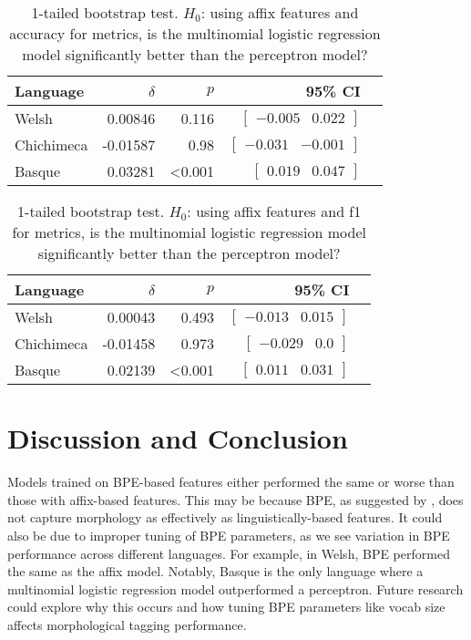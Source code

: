 \documentclass{article}
\begin{document}
\begin{table}[ht]
\centering
\begin{tabular}{lrrrc}
\textbf{Language} & $\delta$ & $p$ & \textbf{95\% CI}\\
\hline
Welsh & 0.00846 & 0.116 & $\begin{bmatrix}-0.005 & 0.022\end{bmatrix}$ \\
Chichimeca & -0.01587 & 0.98 & $\begin{bmatrix}-0.031 & -0.001\end{bmatrix}$ \\
Basque & 0.03281 & <0.001 & $\begin{bmatrix}0.019 & 0.047\end{bmatrix}$ \\
\end{tabular}
\caption{1-tailed bootstrap test. $H_0$: using affix features and accuracy for metrics, is the multinomial logistic regression model significantly better than the perceptron model?}
\label{tab:bpe-accuracy-mc}
\end{table}
\begin{table}[ht]
\centering
\begin{tabular}{lrrrc}
\textbf{Language} & $\delta$ & $p$ & \textbf{95\% CI}\\
\hline
Welsh & 0.00043 & 0.493 & $\begin{bmatrix}-0.013 & 0.015\end{bmatrix}$ \\
Chichimeca & -0.01458 & 0.973 & $\begin{bmatrix}-0.029 & 0.0\end{bmatrix}$ \\
Basque & 0.02139 & <0.001 & $\begin{bmatrix}0.011 & 0.031\end{bmatrix}$ \\
\end{tabular}
\caption{1-tailed bootstrap test. $H_0$: using affix features and f1 for metrics, is the multinomial logistic regression model significantly better than the perceptron model?}
\label{tab:bpe-f1-mc}
\end{table}

\section{Discussion and Conclusion}

Models trained on BPE-based features either performed the same or worse than
those with affix-based features. This may be because BPE, as suggested by
\textcite{mager2022}, does not capture morphology as effectively as
linguistically-based features. It could also be due to improper tuning of BPE
parameters, as we see variation in BPE performance across different languages.
For example, in Welsh, BPE performed the same as the affix model. Notably,
Basque is the only language where a multinomial logistic regression model
outperformed a perceptron. Future research could explore why this occurs and
how tuning BPE parameters like vocab size affects morphological tagging
performance.
\end{document}
